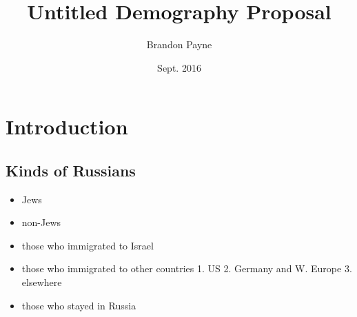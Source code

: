 \documentclass[12pt,twoside]{reedthesis}
\title{Untitled Demography Proposal}
\author{Brandon Payne}
\date{Sept. 2016}
\providecommand{\tightlist}{%
  \setlength{\itemsep}{0pt}\setlength{\parskip}{0pt}}
\begin{document}
      \maketitle
  
  \frontmatter %
  \pagestyle{empty} %

  
  
      \hypersetup{linkcolor=black}
    \setcounter{tocdepth}{1}
    \tableofcontents
  
      \listoftables
  
      \listoffigures
  
  
  
  \mainmatter %
  \pagestyle{fancyplain} %

  \chapter*{Introduction}\label{introduction}
  
  \section{Kinds of Russians}\label{kinds-of-russians}
  
  \begin{itemize}
  \tightlist
  \item
    Jews
  \item
    non-Jews
  \item
    those who immigrated to Israel
  \item
    those who immigrated to other countries 1. US 2. Germany and W. Europe
    3. elsewhere
  \item
    those who stayed in Russia
  \end{itemize}
  
\end{document}
